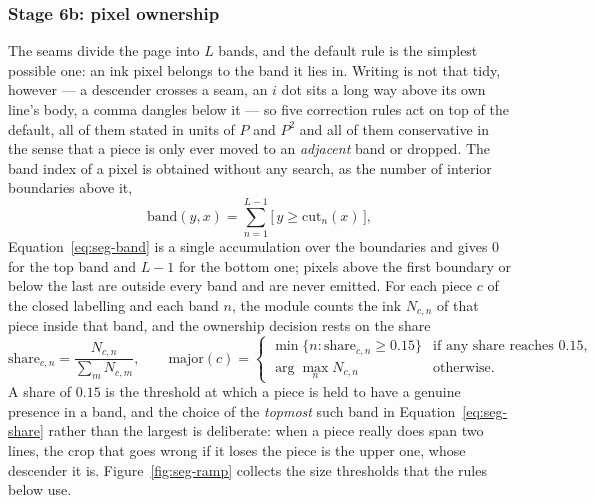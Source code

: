 \subsubsection{Stage 6b: pixel ownership}

The seams divide the page into $L$ bands, and the default rule is the simplest possible one: an ink pixel belongs to the band it lies in.
Writing is not that tidy, however --- a descender crosses a seam, an $i$ dot sits a long way above its own line's body, a comma dangles below it --- so five correction rules act on top of the default, all of them stated in units of $P$ and $P^2$ and all of them conservative in the sense that a piece is only ever moved to an \emph{adjacent} band or dropped.
The band index of a pixel is obtained without any search, as the number of interior boundaries above it,
\begin{equation}
\mathrm{band}(y,x)=\sum_{n=1}^{L-1}\bigl[\,y\ge\mathrm{cut}_n(x)\,\bigr],
\label{eq:seg-band}
\end{equation}
Equation~\ref{eq:seg-band} is a single accumulation over the boundaries and gives $0$ for the top band and $L-1$ for the bottom one; pixels above the first boundary or below the last are outside every band and are never emitted.
For each piece $c$ of the closed labelling and each band $n$, the module counts the ink $N_{c,n}$ of that piece inside that band, and the ownership decision rests on the share
\begin{equation}
\mathrm{share}_{c,n}=\frac{N_{c,n}}{\sum_{m}N_{c,m}},\qquad
\mathrm{major}(c)=\begin{cases}\min\{n:\mathrm{share}_{c,n}\ge0.15\} & \text{if any share reaches }0.15,\\[2pt] \arg\max_n N_{c,n} & \text{otherwise.}\end{cases}
\label{eq:seg-share}
\end{equation}
A share of $0.15$ is the threshold at which a piece is held to have a genuine presence in a band, and the choice of the \emph{topmost} such band in Equation~\ref{eq:seg-share} rather than the largest is deliberate: when a piece really does span two lines, the crop that goes wrong if it loses the piece is the upper one, whose descender it is.
Figure~\ref{fig:seg-ramp} collects the size thresholds that the rules below use.

